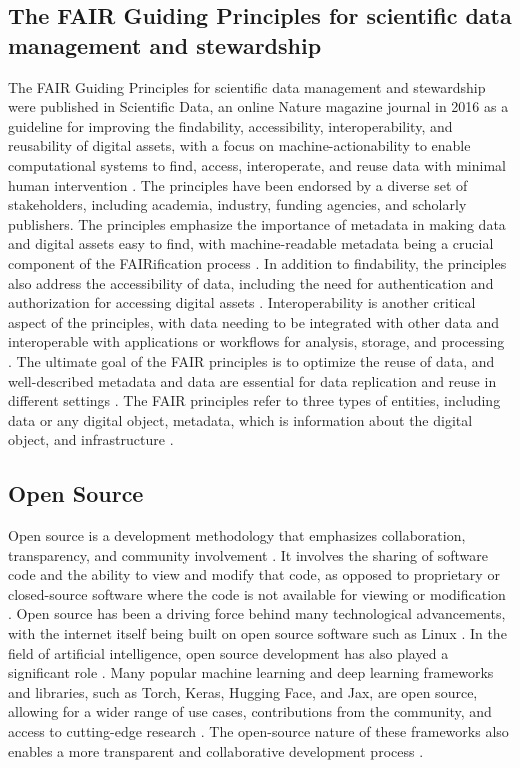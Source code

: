 \subsection{The FAIR Guiding Principles for scientific data management and stewardship }
The FAIR Guiding Principles for scientific data management and stewardship were published in Scientific Data, an online Nature magazine journal in 2016 as a guideline for improving the findability, accessibility, interoperability, and reusability of digital assets, with a focus on machine-actionability to enable computational systems to find, access, interoperate, and reuse data with minimal human intervention \cite{wilkinson2016fair}. The principles have been endorsed by a diverse set of stakeholders, including academia, industry, funding agencies, and scholarly publishers. The principles emphasize the importance of metadata in making data and digital assets easy to find, with machine-readable metadata being a crucial component of the FAIRification process \cite{wilkinson2016fair}. In addition to findability, the principles also address the accessibility of data, including the need for authentication and authorization for accessing digital assets \cite{wilkinson2016fair}. Interoperability is another critical aspect of the principles, with data needing to be integrated with other data and interoperable with applications or workflows for analysis, storage, and processing \cite{wilkinson2016fair}. The ultimate goal of the FAIR principles is to optimize the reuse of data, and well-described metadata and data are essential for data replication and reuse in different settings \cite{wilkinson2016fair}. The FAIR principles refer to three types of entities, including data or any digital object, metadata, which is information about the digital object, and infrastructure \cite{wilkinson2016fair}.


\subsection{Open Source}
Open source is a development methodology that emphasizes collaboration, transparency, and community involvement \cite{dibona1999opensource}. It involves the sharing of software code and the ability to view and modify that code, as opposed to proprietary or closed-source software where the code is not available for viewing or modification \cite{dibona1999opensource}. Open source has been a driving force behind many technological advancements, with the internet itself being built on open source software such as Linux \cite{dibona1999opensource}.
In the field of artificial intelligence, open source development has also played a significant role \cite{gundersen2018reproducible}. Many popular machine learning and deep learning frameworks and libraries, such as Torch, Keras, Hugging Face, and Jax, are open source, allowing for a wider range of use cases, contributions from the community, and access to cutting-edge research \cite{nguyen2019machine, coro2020open}. The open-source nature of these frameworks also enables a more transparent and collaborative development process \cite{coro2020open}.

